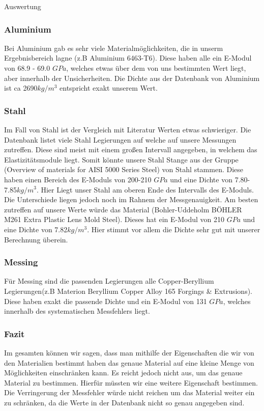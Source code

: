 \documentclass[twoside]{protokoll}
\begin{document}
\begin{aufgabe}{Auswertung}
\subsubsection{Aluminium}
Bei Aluminium gab es sehr viele Materialmöglichkeiten, die in unserm Ergebnisbereich lagne (z.B Aluminium 6463-T6).
Diese haben alle ein E-Modul von 68.9 - 69.0 $GPa$, welches etwas über dem von uns bestimmten Wert liegt, aber innerhalb der Unsicherheiten.
Die Dichte aus der Datenbank von Aluminium ist ca 2690$kg/m^3$ entspricht exakt unserem Wert.
 
\subsubsection{Stahl}
Im Fall von Stahl ist der Vergleich mit Literatur Werten etwas schwieriger. 
Die Datenbank listet viele Stahl Legierungen auf welche auf unsere Messungen zutreffen.
Diese sind meist mit einem großen Intervall angegeben, in welchem das Elastizitätsmodule liegt.
Somit könnte unsere Stahl Stange aus der Gruppe (Overview of materials for AISI 5000 Series Steel) von Stahl stammen. Diese haben einen Bereich des E-Moduls von 200-210 $GPa$ und eine Dichte von 7.80-7.85$kg/m^3$. Hier Liegt unser Stahl am oberen Ende des Intervalls des E-Moduls. Die Unterschiede liegen jedoch noch im Rahnem der Messgenauigkeit. 
Am besten zutreffen auf unsere Werte würde das Material (Bohler-Uddeholm BÖHLER M261 Extra Plastic Lens Mold Steel). Dieses hat ein E-Modul von 210 $GPa$ und eine Dichte von
7.82$kg/m^3$. Hier stimmt vor allem die Dichte sehr gut mit unserer Berechnung überein.
 
\subsubsection{Messing}
Für Messing sind die passenden Legierungen alle Copper-Beryllium Legierungen(z.B Materion Beryllium Copper Alloy 165 Forgings \& Extrusions).
Diese haben exakt die passende Dichte und ein E-Modul von 131 $GPa$, welches innerhalb des systematischen Messfehlers liegt.\\
 
\subsubsection{Fazit}
Im gesamten können wir sagen, dass man mithilfe der Eigenschaften die wir von den Materialien bestimmt haben das genaue Material auf eine kleine Menge von Möglichkeiten einschränken kann. 
Es reicht jedoch nicht aus, um das genaue Material zu bestimmen. Hierfür müssten wir 
eine weitere Eigenschaft bestimmen. Die Verringerung der Messfehler würde nicht reichen
um das Material weiter ein zu schränken, da die Werte in der Datenbank nicht so genau angegeben sind. 
\end{aufgabe}
\end{document}
